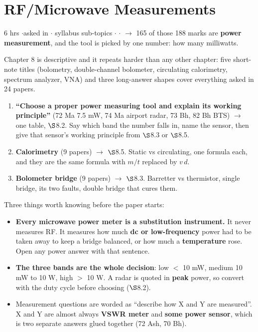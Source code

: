 \section{RF/Microwave Measurements}
{\color{sub}\footnotesize 6 hrs \gap$\cdot$\gap asked in 
\gap$\cdot$ syllabus sub-topics \gap$\cdot$\gap {} \gap$\cdot$\gap {}
$\rightarrow$ 165 of those 188 marks are \textbf{power measurement}, and the tool is picked
by one number: how many milliwatts.}

\vspace{3pt}\noindent
\colorbox{gdL}{\makebox[\dimexpr\textwidth-2\fboxsep][l]{%
  \textcolor{gd}{\bfseries\footnotesize READ THIS FIRST}}}
\par\nobreak\vspace{3pt}

Chapter 8 is descriptive and it repeats harder than any other chapter: five short-note
titles (bolometry, double-channel bolometer, circulating calorimetry, spectrum analyzer,
VNA) and three long-answer shapes cover everything asked in 24 papers.
\begin{enumerate}[label=\arabic*., leftmargin=1.4em, itemsep=1pt]
  \item \textbf{``Choose a proper power measuring tool and explain its working principle''}
    (72 Ma 7.5 mW, 74 Ma airport radar, 73 Bh, 82 Bh BTS) $\rightarrow$ one table,
    $\S$8.2. Say which band the number falls in, name the sensor, then give that sensor's
    working principle from $\S$8.3 or $\S$8.5. 
  \item \textbf{Calorimetry} (9 papers) $\rightarrow$ $\S$8.5. Static vs circulating, one
    formula each, and they are the same formula with $m/t$ replaced by $v\,d$.
  \item \textbf{Bolometer bridge} (9 papers) $\rightarrow$ $\S$8.3. Barretter vs thermistor,
    single bridge, its two faults, double bridge that cures them.
\end{enumerate}
Three things worth knowing before the paper starts:
\begin{itemize}
  \item \textbf{Every microwave power meter is a substitution instrument.} It never measures
    RF. It measures how much \textbf{dc or low-frequency} power had to be taken away to keep
    a bridge balanced, or how much a \textbf{temperature} rose. Open any power answer with
    that sentence.
  \item \textbf{The three bands are the whole decision}: low $<$ 10 mW, medium 10 mW to
    10 W, high $>$ 10 W. A radar is quoted in \textbf{peak} power, so convert with the duty
    cycle before choosing ($\S$8.2).
  \item Measurement questions are worded as ``describe how X and Y are measured''. X and Y
    are almost always \textbf{VSWR meter} and \textbf{some power sensor}, which is two
    separate answers glued together (72 Ash, 70 Bh).
\end{itemize}


